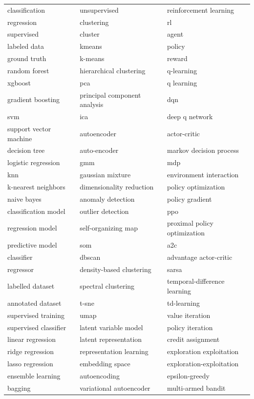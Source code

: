 \begin{xltabular}{\textwidth}{XXX}
\bottomrule
\endlastfoot
classification & unsupervised & reinforcement learning \\
regression & clustering & rl \\
supervised & cluster & agent \\
labeled data & kmeans & policy \\
ground truth & k-means & reward \\
random forest & hierarchical clustering & q-learning \\
xgboost & pca & q learning \\
gradient boosting & principal component analysis & dqn \\
svm & ica & deep q network \\
support vector machine & autoencoder & actor-critic \\
decision tree & auto-encoder & markov decision process \\
logistic regression & gmm & mdp \\
knn & gaussian mixture & environment interaction \\
k-nearest neighbors & dimensionality reduction & policy optimization \\
naive bayes & anomaly detection & policy gradient \\
classification model & outlier detection & ppo \\
regression model & self-organizing map & proximal policy optimization \\
predictive model & som & a2c \\
classifier & dbscan & advantage actor-critic \\
regressor & density-based clustering & sarsa \\
labelled dataset & spectral clustering & temporal-difference learning \\
annotated dataset & t-sne & td-learning \\
supervised training & umap & value iteration \\
supervised classifier & latent variable model & policy iteration \\
linear regression & latent representation & credit assignment \\
ridge regression & representation learning & exploration exploitation \\
lasso regression & embedding space & exploration-exploitation \\
ensemble learning & autoencoding & epsilon-greedy \\
bagging & variational autoencoder & multi-armed bandit \\

\end{xltabular}
